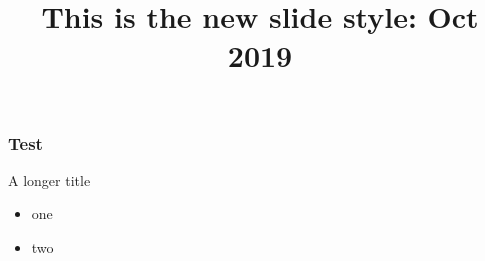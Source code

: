 \documentclass{beamer}
\begin{document}
\begin{frame}
\title{This is the new slide style: \newline Oct 2019}
\titlepage
\end{frame}
\begin{frame}
	\frametitle{Test}
	
\end{frame}
\begin{frame}{A longer title}
	\begin{itemize}
		\item one
		\item two
	\end{itemize}
\end{frame}
\end{document}
